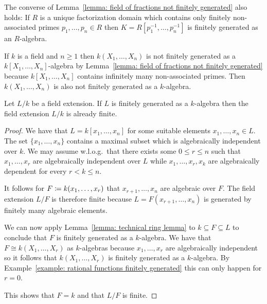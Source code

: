\begin{remark}
  The converse of Lemma~\ref{lemma: field of fractions not finitely generated} also holds:
  If $R$ is a unique factorization domain which contains only finitely non-associated primes $p_1, \dotsc, p_n \in R$ then $K = R[p_1^{-1}, \dotsc, p_n^{-1}]$ is finitely generated as an $R$-algebra.
\end{remark}


\begin{example}
  \label{example: rational functions finitely generated}
  If $k$ is a field and $n \geq 1$ then $k(X_1, \dotsc, X_n)$ is not finitely generated as a $k[X_1, \dotsc, X_n]$-algebra by Lemma~\ref{lemma: field of fractions not finitely generated} because $k[X_1, \dotsc, X_n]$ contains infinitely many non-associated primes.
  Then $k(X_1, \dotsc, X_n)$ is also not finitely generated as a $k$-algebra.
\end{example}


\begin{corollary}
  \label{corollary: finitely generated field extensions are finite}
  Let $L/k$ be a field extension.
  If $L$ is finitely generated as a $k$-algebra then the field extension $L/k$ is already finite.
\end{corollary}


\begin{proof}
  We have that $L = k[x_1, \dotsc, x_n]$ for some suitable elements $x_1, \dotsc, x_n \in L$.
  The set $\{x_1, \dotsc, x_n\}$ contains a maximal subset which is algebraically independent over $k$.
  We may assume w.l.o.g.\ that there exists some $0 \leq r \leq n$ such that $x_1, \dotsc, x_r$ are algebraically independent over $L$ while $x_1, \dotsc, x_r, x_k$ are algebraically dependent for every $r < k \leq n$.
  
  It follows for $F \coloneqq k(x_1, \dotsc, x_r)$ that $x_{r+1}, \dotsc, x_n$ are algebraic over $F$.
  The field extension $L/F$ is therefore finite because $L = F(x_{r+1}, \dotsc, x_n)$ is generated by finitely many algebraic elements.
  
  We can now apply Lemma~\ref{lemma: technical ring lemma} to $k \subseteq F \subseteq L$ to conclude that $F$ is finitely generated as a $k$-algebra.
  We have that $F \cong k(X_1, \dotsc, X_r)$ as $k$-algebras because $x_1, \dotsc, x_r$ are algebraically independent so it follows that $k(X_1, \dotsc, X_r)$ is finitely generated as a $k$-algebra.
  By Example~\ref{example: rational functions finitely generated} this can only happen for $r = 0$.
  
  This shows that $F = k$ and that $L/F$ is finite.
\end{proof}
